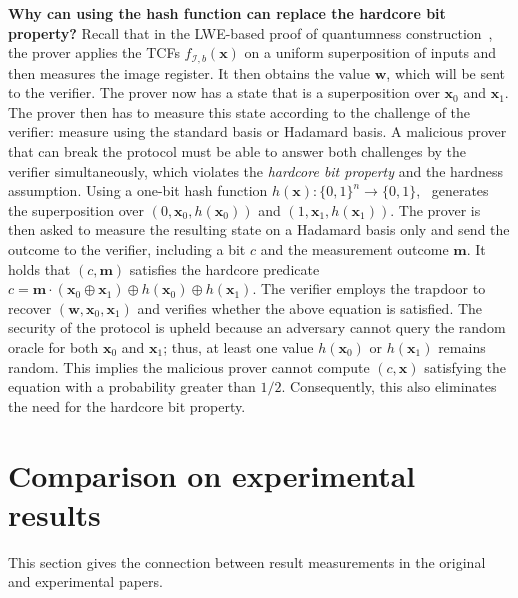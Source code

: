 \documentclass[cryptography,review,submit,pdftex,moreauthors,amsmath,amssymb,aps,strict]{Definitions/mdpi}
\begin{document}
\textbf{Why can using the hash function can replace the hardcore bit property?} Recall that in the LWE-based proof of quantumness construction~\cite{Brakerski18_Interactiveproofofquantumness}, the prover applies the TCFs $f_{\mathcal{I},b}(\mathbf{x})$ on a uniform superposition of inputs and then measures the image register. It then obtains the value $\mathbf{w}$, which will be sent to the verifier. The prover now has a state that is a superposition over $\mathbf{x}_0$ and $\mathbf{x}_1$. The prover then has to measure this state according to the challenge of the verifier: measure using the standard basis or Hadamard basis. A malicious prover that can break the protocol must be able to answer both challenges by the verifier simultaneously, which violates the \textit{hardcore bit property} and the hardness assumption. Using a one-bit hash function $h(\mathbf{x}):\{0,1\}^n\to \{0,1\}$,~\cite{BrakerskiProofofQuantumness} generates the superposition over $(0,\mathbf{x}_0,h(\mathbf{x}_0))$ and $(1,\mathbf{x}_1,h(\mathbf{x}_1))$. The prover is then asked to measure the resulting state on a Hadamard basis only and send the outcome to the verifier, including a bit $c$ and the measurement outcome $\mathbf{m}$. It holds that $(c,\mathbf{m})$ satisfies the hardcore predicate $c=\mathbf{m}\cdot(\mathbf{x}_0\oplus \mathbf{x}_1)\oplus h(\mathbf{x}_0)\oplus h(\mathbf{x}_1)$. The verifier employs the trapdoor to recover $(\mathbf{w},\mathbf{x}_0,\mathbf{x}_1)$ and verifies whether the above equation is satisfied. The security of the protocol is upheld because an adversary cannot query the random oracle for both $\mathbf{x}_0$ and $\mathbf{x}_1$; thus, at least one value $h(\mathbf{x}_0)$ or $h(\mathbf{x}_1)$ remains random. This implies the malicious prover cannot compute $(c,\mathbf{x})$ satisfying the equation with a probability greater than $1/2$. Consequently, this also eliminates the need for the hardcore bit property. 

\section{Comparison on experimental results}

This section gives the connection between result measurements in the original and experimental papers.
\end{document}
